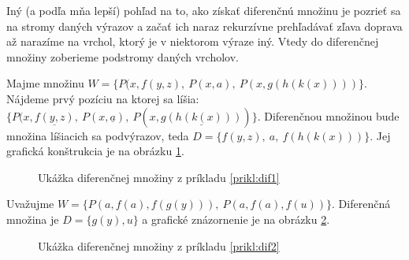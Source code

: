 \begin{poznamka}
    Iný (a podľa mňa lepší) pohľad na to, ako získať diferenčnú množinu je
    pozrieť sa na stromy daných výrazov a začať ich naraz rekurzívne
    prehľadávať zľava doprava až narazíme na vrchol, ktorý je v niektorom
    výraze iný. Vtedy do diferenčnej množiny zoberieme podstromy daných
    vrcholov.
\end{poznamka}

\begin{priklad}
    \label{prikl:dif1}
    Majme množinu $W = \{P(x,f(y,z),\ P(x,a),\ P(x,g(h(k(x))))\}$.
    Nájdeme prvý pozíciu na ktorej sa líšia:
    $\{P(x,\underline{f(y,z)},\ P(x,\underline{a}),\
    P(x,\underline{g(h(k(x)))}) \}$.
    Diferenčnou množinou bude množina líšiacich sa podvýrazov, teda
    $D= \{ f(y,z),\ a,\ f(h(k(x)))\}$. Jej grafická konštrukcia je na
    obrázku \ref{fig:dif1}.
    \begin{figure}[h]
        \centering

        \caption{Ukážka diferenčnej množiny z príkladu \ref{prikl:dif1}}
        \label{fig:dif1}
    \end{figure}
\end{priklad}

\begin{priklad}
    \label{prikl:dif2}
    Uvažujme $W=\{P(a,f(a),f(g(y))),\ P(a,f(a),f(u))\}$.
    Diferenčná množina je $D=\{g(y),u\}$ a grafické znázornenie je na
    obrázku \ref{fig:dif2}.
    \begin{figure}[h]
        \centering

        \caption{Ukážka diferenčnej množiny z príkladu \ref{prikl:dif2}}
        \label{fig:dif2}
    \end{figure}
\end{priklad}


